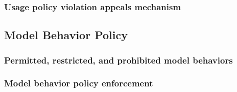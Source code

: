 \documentclass{article}
\begin{document}

\subsubsection{Usage policy violation appeals mechanism}


\subsection{Model Behavior Policy}
\subsubsection{Permitted, restricted, and prohibited model behaviors}


\subsubsection{Model behavior policy enforcement}
\end{document}
